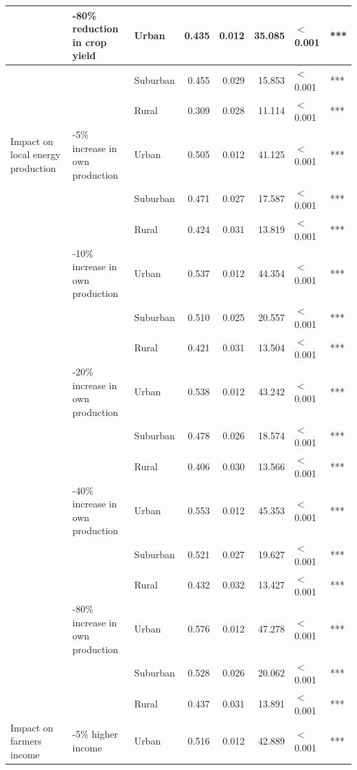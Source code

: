 \begin{longtable}[t]{>{\raggedright\arraybackslash}p{4cm}>{\raggedright\arraybackslash}p{4cm}>{\raggedright\arraybackslash}p{2.5cm}rrrll}
\cmidrule{2-8}\nopagebreak
 & 41-80\% reduction in crop yield & Urban & 0.435 & 0.012 & 35.085 & $<$0.001 & ***\\
\cmidrule{3-8}\nopagebreak
 &  & Suburban & 0.455 & 0.029 & 15.853 & $<$0.001 & ***\\
\cmidrule{3-8}\nopagebreak
 &  & Rural & 0.309 & 0.028 & 11.114 & $<$0.001 & ***\\
\cmidrule{1-8}\pagebreak[0]
Impact on local energy production & 0-5\% increase in own production & Urban & 0.505 & 0.012 & 41.125 & $<$0.001 & ***\\
\cmidrule{3-8}\nopagebreak
 &  & Suburban & 0.471 & 0.027 & 17.587 & $<$0.001 & ***\\
\cmidrule{3-8}\nopagebreak
 &  & Rural & 0.424 & 0.031 & 13.819 & $<$0.001 & ***\\
\cmidrule{2-8}\nopagebreak
 & 6-10\% increase in own production & Urban & 0.537 & 0.012 & 44.354 & $<$0.001 & ***\\
\cmidrule{3-8}\nopagebreak
 &  & Suburban & 0.510 & 0.025 & 20.557 & $<$0.001 & ***\\
\cmidrule{3-8}\nopagebreak
 &  & Rural & 0.421 & 0.031 & 13.504 & $<$0.001 & ***\\
\cmidrule{2-8}\nopagebreak
 & 11-20\% increase in own production & Urban & 0.538 & 0.012 & 43.242 & $<$0.001 & ***\\
\cmidrule{3-8}\nopagebreak
 &  & Suburban & 0.478 & 0.026 & 18.574 & $<$0.001 & ***\\
\cmidrule{3-8}\nopagebreak
 &  & Rural & 0.406 & 0.030 & 13.566 & $<$0.001 & ***\\
\cmidrule{2-8}\nopagebreak
 & 21-40\% increase in own production & Urban & 0.553 & 0.012 & 45.353 & $<$0.001 & ***\\
\cmidrule{3-8}\nopagebreak
 &  & Suburban & 0.521 & 0.027 & 19.627 & $<$0.001 & ***\\
\cmidrule{3-8}\nopagebreak
 &  & Rural & 0.432 & 0.032 & 13.427 & $<$0.001 & ***\\
\cmidrule{2-8}\nopagebreak
 & 41-80\% increase in own production & Urban & 0.576 & 0.012 & 47.278 & $<$0.001 & ***\\
\cmidrule{3-8}\nopagebreak
 &  & Suburban & 0.528 & 0.026 & 20.062 & $<$0.001 & ***\\
\cmidrule{3-8}\nopagebreak
 &  & Rural & 0.437 & 0.031 & 13.891 & $<$0.001 & ***\\
\cmidrule{1-8}\pagebreak[0]
Impact on farmers income & 0-5\% higher income & Urban & 0.516 & 0.012 & 42.889 & $<$0.001 & ***\\

\end{longtable}
